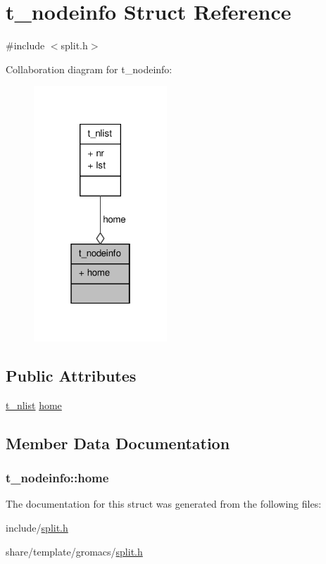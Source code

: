 \hypertarget{structt__nodeinfo}{\section{t\-\_\-nodeinfo \-Struct \-Reference}
\label{structt__nodeinfo}
}


{\ttfamily \#include $<$split.\-h$>$}



\-Collaboration diagram for t\-\_\-nodeinfo\-:
\nopagebreak
\begin{figure}[H]
\begin{center}
\leavevmode
\includegraphics[width=142pt]{structt__nodeinfo__coll__graph}
\end{center}
\end{figure}
\subsection*{\-Public \-Attributes}
\begin{DoxyCompactItemize}
\item 
\hyperlink{structt__nlist}{t\-\_\-nlist} \hyperlink{structt__nodeinfo_a2d152cc0da83b8a2fa6997dc553d7554}{home}
\end{DoxyCompactItemize}


\subsection{\-Member \-Data \-Documentation}
\hypertarget{structt__nodeinfo_a2d152cc0da83b8a2fa6997dc553d7554}{
\subsubsection[{home}]{ {\bf t\-\_\-nodeinfo\-::home}}}\label{structt__nodeinfo_a2d152cc0da83b8a2fa6997dc553d7554}


\-The documentation for this struct was generated from the following files\-:\begin{DoxyCompactItemize}
\item 
include/\hyperlink{include_2split_8h}{split.\-h}\item 
share/template/gromacs/\hyperlink{share_2template_2gromacs_2split_8h}{split.\-h}\end{DoxyCompactItemize}
